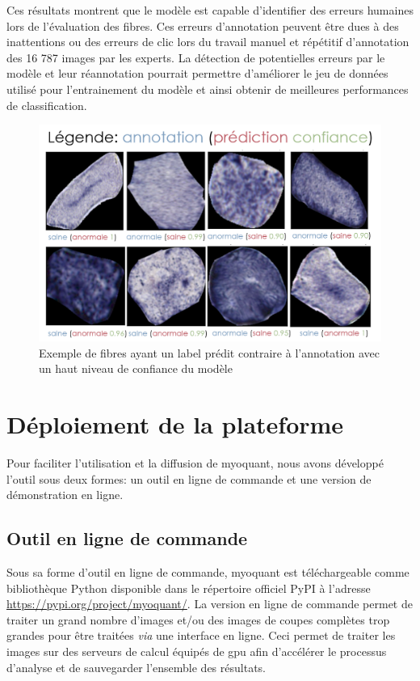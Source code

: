 Ces résultats montrent que le modèle est capable d'identifier des erreurs humaines lors de l'évaluation des fibres. Ces erreurs d'annotation peuvent être dues à des inattentions ou des erreurs de clic lors du travail manuel et répétitif d'annotation des  16 787 images par les experts. La détection de potentielles erreurs par le modèle et leur réannotation pourrait permettre d'améliorer le jeu de données utilisé pour l'entrainement du modèle et ainsi obtenir de meilleures performances de classification.
\begin{figure}[!ht]
 \centering
 \includegraphics[width=1\textwidth]{figures/list_sdh_errors.png}
 \caption[Exemple de fibres ayant un label prédit contraire a l'annotation avec un haut niveau de confiance du modèle]{Exemple de fibres ayant un label prédit contraire à l'annotation avec un haut niveau de confiance du modèle}
 \label{fig:list_errors}
\end{figure}

\section{Déploiement de la plateforme}
Pour faciliter l'utilisation et la diffusion de \gls{myoquant}, nous avons développé l'outil sous deux formes: un outil en ligne de commande et une version de démonstration en ligne.

\subsection{Outil en ligne de commande}
Sous sa forme d'outil en ligne de commande, \gls{myoquant} est téléchargeable comme bibliothèque Python disponible dans le répertoire officiel PyPI à l'adresse \href{https://pypi.org/project/myoquant/}{https://pypi.org/project/myoquant/}. La version en ligne de commande permet de traiter un grand nombre d'images et/ou des images de coupes complètes trop grandes pour être traitées \textit{via} une interface en ligne. Ceci permet de traiter les images sur des serveurs de calcul équipés de \gls{gpu} afin d'accélérer le processus d'analyse et de sauvegarder l'ensemble des résultats.

